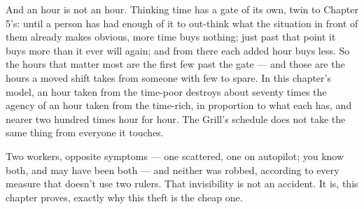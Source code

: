 And an hour is not an hour. Thinking time has a gate of its own, twin
to Chapter 5's: until a person has had enough of it to out-think what
the situation in front of them already makes obvious, more time buys
nothing; just past that point it buys more than it ever will again;
and from there each added hour buys less. So the hours that matter
most are the first few past the gate --- and those are the hours a moved
shift takes from someone with few to spare. In this chapter's model,
an hour taken from the time-poor destroys about seventy times the
agency of an hour taken from the time-rich, in proportion to what each
has, and nearer two hundred times hour for hour. The Grill's schedule
does not take the same thing from everyone it touches.

Two workers, opposite symptoms --- one scattered, one on autopilot; you
know both, and may have been both --- and neither was robbed, according
to every measure that doesn't use two rulers. That invisibility is not
an accident. It is, this chapter proves, exactly why this theft is the
cheap one.

